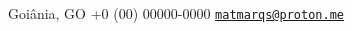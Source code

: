 \documentclass[a4paper]{article}
\makeatletter
\newcommand{\myphone}{+0 (00) 00000-0000}
\newcommand{\myemail}{\href{mailto:matmarqs@proton.me}{\texttt{matmarqs@proton.me}}}
\newcommand{\mycity}{Goiânia, GO}
\makeatother
\begin{document}
\begin{paracol}{2}
\vspace{2em}

\newlength{\rightcolwidth}
\setlength{\rightcolwidth}{0.75\textwidth}
\begin{minipage}[t]{\rightcolwidth}
\begin{center}\fontfamily{\sfdefault}\selectfont \color{black!70}
{\small
 \mycity \;\;
 \myphone \;\;
 \myemail
}
\end{center}
\end{minipage}



\end{paracol}
\end{document}
